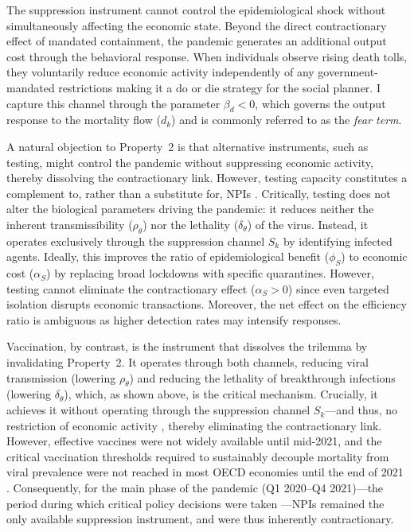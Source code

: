 \documentclass[12pt, a4paper]{article}
\begin{document}
The suppression instrument cannot control the epidemiological shock without simultaneously affecting the economic state. Beyond the direct contractionary effect of mandated containment, the pandemic generates an additional output cost through the behavioral response. When individuals observe rising death tolls, they voluntarily reduce economic activity independently of any government-mandated restrictions \citep{GOOLSBEE2021} making it a do or die strategy for the social planner. I capture this channel through the parameter $\beta_d < 0$, which governs the output response to the mortality flow ($d_k$) and is commonly referred to as the \textit{fear term}. 

A natural objection to Property~2 is that alternative instruments, such as testing, might control the pandemic without suppressing economic activity, thereby dissolving the contractionary link. However, testing capacity constitutes a complement to, rather than a substitute for, NPIs \citep{repec:nbr}. Critically, testing does not alter the biological parameters driving the pandemic: it reduces neither the inherent transmissibility ($\rho_\theta$) nor the lethality ($\delta_\theta$) of the virus. Instead, it operates exclusively through the suppression channel $S_k$ by identifying infected agents. Ideally, this improves the ratio of epidemiological benefit ($\phi_S$) to economic cost ($\alpha_S$) by replacing broad lockdowns with specific quarantines. However, testing cannot eliminate the contractionary effect ($\alpha_S > 0$) since even targeted isolation disrupts economic transactions. Moreover, the net effect on the efficiency ratio is ambiguous as higher detection rates may intensify responses.

Vaccination, by contrast, is the instrument that dissolves the trilemma by invalidating Property~2. It operates through both channels, reducing viral transmission (lowering $\rho_\theta$) and reducing the lethality of breakthrough infections (lowering $\delta_\theta$), which, as shown above, is the critical mechanism. Crucially, it achieves it without operating through the suppression channel $S_k$---and thus, no restriction of economic activity \citep{Giordano2021V}, thereby eliminating the contractionary link. However, effective vaccines were not widely available until mid-2021, and the critical vaccination thresholds required to sustainably decouple mortality from viral prevalence were not reached in most OECD economies until the end of 2021 \citep{OECD2021}. Consequently, for the main phase of the pandemic (Q1 2020--Q4 2021)---the period during which critical policy decisions were taken \citep{Hale2021}---NPIs remained the only available suppression instrument, and were thus inherently contractionary.
\end{document}
